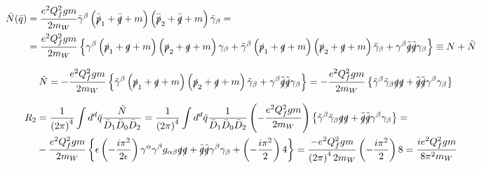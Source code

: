 \begin{align*}
\bar{N} (\bar{q}) & = \frac{e^2Q_f^2gm}{2m_W} \bar{\gamma}^{\beta} \left( \bar{\slashed{p}}_1 + \bar{\slashed{q}} + m \right) \left( \bar{\slashed{p}}_2 + \bar{\slashed{q}} + m \right) \bar{\gamma}_{\beta} = & \\
& = \frac{e^2Q_f^2gm}{2m_W} \left\lbrace \gamma^{\beta} \left( \slashed{p}_1 + \slashed{q} + m \right) \left( \slashed{p}_2 + \slashed{q} + m \right) \gamma_{\beta} + \tilde{\gamma}^{\beta} \left( \slashed{p}_1 + \slashed{q} + m \right) \left( \slashed{p}_2 + \slashed{q} + m \right) \tilde{\gamma}_{\beta} + \gamma^{\beta} \tilde{\slashed{q}} \tilde{\slashed{q}} \gamma_{\beta} \right\rbrace \equiv N + \tilde{N} &
\end{align*}

\begin{equation*}
\tilde{N} = -\frac{e^2Q_f^2gm}{2m_W} \left\lbrace \tilde{\gamma}^{\beta} \left( \slashed{p}_1 + \slashed{q} + m \right) \left( \slashed{p}_2 + \slashed{q} + m \right) \tilde{\gamma}_{\beta} + \gamma^{\beta} \tilde{\slashed{q}} \tilde{\slashed{q}} \gamma_{\beta} \right\rbrace = -\frac{e^2Q_f^2gm}{2m_W} \left\lbrace \tilde{\gamma}^{\beta}\tilde{\gamma}_{\beta} \slashed{q}\slashed{q} + \tilde{\slashed{q}} \tilde{\slashed{q}} \gamma^{\beta}\gamma_{\beta} \right\rbrace 
\end{equation*}

\begin{align*}
R_2 & = \frac{1}{\left( 2\pi \right)^4} \int d^d \bar{q} \frac{\tilde{N}}{\bar{D}_1\bar{D}_0\bar{D}_2} = \frac{1}{\left( 2\pi \right)^4} \int d^d \bar{q} \frac{1}{\bar{D}_1\bar{D}_0\bar{D}_2} \left(-\frac{e^2Q_f^2gm}{2m_W} \right) \left\lbrace \tilde{\gamma}^{\beta}\tilde{\gamma}_{\beta} \slashed{q}\slashed{q} + \tilde{\slashed{q}} \tilde{\slashed{q}} \gamma^{\beta}\gamma_{\beta} \right\rbrace  = & \\
& -\frac{e^2Q_f^2gm}{2m_W} \left\lbrace \epsilon \left( -\frac{i\pi^2}{2\epsilon} \right) \gamma^{\alpha} \gamma^{\beta} g_{\alpha\beta} \slashed{q}\slashed{q} + \tilde{\slashed{q}} \tilde{\slashed{q}} \gamma^{\beta}\gamma_{\beta} + \left( - \frac{i\pi^2}{2} \right) 4 \right\rbrace = \frac{-e^2Q_f^2gm}{\left( 2\pi \right)^4 2m_W} \left( - \frac{i\pi^2}{2} \right) 8 = \frac{ie^2Q_f^2gm}{8\pi^2m_W} &
\end{align*}